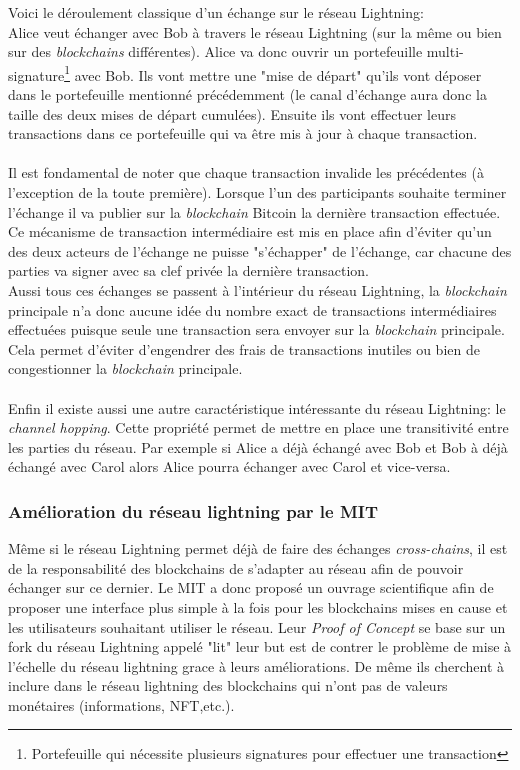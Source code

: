 Voici le déroulement classique d'un échange sur le réseau Lightning:\\ Alice veut échanger avec Bob à travers le réseau Lightning (sur la même ou bien sur des \textit{blockchains} différentes). 
Alice va donc ouvrir un portefeuille multi-signature\footnote{Portefeuille qui nécessite plusieurs signatures pour effectuer une transaction} avec Bob. Ils vont mettre une "mise de départ" qu'ils vont déposer dans le portefeuille mentionné précédemment (le canal d'échange aura donc la taille des deux mises de départ cumulées).
Ensuite ils vont effectuer leurs transactions dans ce portefeuille qui va être mis à jour à chaque transaction.\\ \\ 
Il est fondamental de noter que chaque transaction invalide les précédentes (à l'exception de la toute première). Lorsque l'un des participants souhaite terminer l'échange il va publier sur la \textit{blockchain} Bitcoin la dernière transaction effectuée.
Ce mécanisme de transaction intermédiaire est mis en place afin d'éviter qu'un des deux acteurs de l'échange ne puisse "s'échapper" de l'échange, car chacune des parties va signer avec sa clef privée la dernière transaction. \\
Aussi tous ces échanges se passent à l'intérieur du réseau Lightning, la \textit{blockchain} principale n'a donc aucune idée du nombre exact de transactions intermédiaires effectuées puisque seule une transaction sera envoyer sur la \textit{blockchain} principale. 
Cela permet d'éviter d'engendrer des frais de transactions inutiles ou bien de congestionner la \textit{blockchain} principale.\\ \\
 Enfin il existe aussi une autre caractéristique intéressante du réseau Lightning: le \textit{channel hopping}. 
Cette propriété permet de mettre en place une transitivité entre les parties du réseau. Par exemple si Alice a déjà échangé avec Bob et Bob à déjà échangé avec Carol alors Alice pourra échanger avec Carol et vice-versa. 


\subsubsection{Amélioration du réseau lightning par le MIT}

Même si le réseau Lightning permet déjà de faire des échanges \textit{cross-chains}\cite{lightningCrossChain}, il est de la responsabilité des blockchains de s'adapter au réseau afin de pouvoir échanger sur ce dernier.
Le MIT a donc proposé un ouvrage scientifique\cite{mathus2018lightning} afin de proposer une interface plus simple à la fois pour les blockchains mises en cause et les utilisateurs souhaitant utiliser le réseau.
Leur \textit{Proof of Concept}\cite{pocMIT} se base sur un fork du réseau Lightning appelé "lit" leur but est de contrer le problème de mise à l'échelle du réseau lightning grace à leurs améliorations.
De même ils cherchent à inclure dans le réseau lightning des blockchains qui n'ont pas de valeurs monétaires (informations, NFT,etc.).

